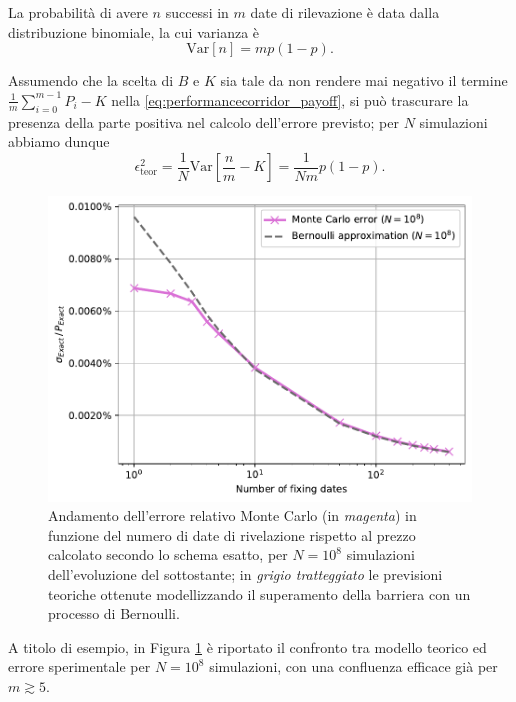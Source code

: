 La probabilità di avere $n$ successi in $m$ date di rilevazione è data dalla distribuzione binomiale, la cui varianza è
\begin{equation}
    \text{Var}[n] = mp(1-p).
    \label{eq:binomial_variance}
\end{equation}

Assumendo che la scelta di $B$ e $K$ sia tale da non rendere mai negativo il termine $\frac{1}{m} \sum_{i=0}^{m-1}{P_i} - K$ nella \eqref{eq:performancecorridor_payoff}, si può trascurare la presenza della parte positiva nel calcolo dell'errore previsto; per $N$ simulazioni abbiamo dunque
\begin{equation}
    \epsilon^2_{\text{teor}} = \frac{1}{N} \text{Var}\left[\frac{n}{m} - K\right] = \frac{1}{Nm} p(1-p).
    \label{eq:error_theoretical_squared}
\end{equation}

\begin{figure}[t]
    \centering
    \includegraphics[scale=0.5]{graphs/OptionPriceVsM_ExactErrorVsM_N108.pdf}
    \caption{Andamento dell'errore relativo Monte Carlo (in \textit{magenta}) in funzione del numero di date di rivelazione rispetto al prezzo calcolato secondo lo schema esatto, per $N={10}^8$ simulazioni dell'evoluzione del sottostante; in \textit{grigio tratteggiato} le previsioni teoriche ottenute modellizzando il superamento della barriera con un processo di Bernoulli.}
    \label{fig:theoretical_vs_experimental_error}
\end{figure}

A titolo di esempio, in Figura \ref{fig:theoretical_vs_experimental_error} è riportato il confronto tra modello teorico ed errore sperimentale per $N={10}^8$ simulazioni, con una confluenza efficace già per $m \gtrsim 5$.

